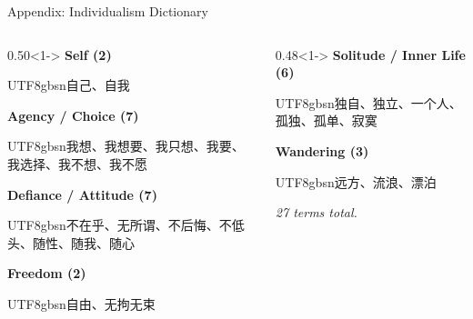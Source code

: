 \documentclass[aspectratio=169]{beamer}
\begin{document}
\begin{frame}[label=appendix-indiv-dict]{Appendix: Individualism Dictionary}
\footnotesize
\begin{columns}[T]
\begin{column}{0.50\textwidth}<1->
  \textbf{Self (2)} \\
  \begin{CJK}{UTF8}{gbsn}自己、自我\end{CJK}

  \smallskip
  \textbf{Agency / Choice (7)} \\
  \begin{CJK}{UTF8}{gbsn}我想、我想要、我只想、我要、我选择、我不想、我不愿\end{CJK}

  \smallskip
  \textbf{Defiance / Attitude (7)} \\
  \begin{CJK}{UTF8}{gbsn}不在乎、无所谓、不后悔、不低头、随性、随我、随心\end{CJK}

  \smallskip
  \textbf{Freedom (2)} \\
  \begin{CJK}{UTF8}{gbsn}自由、无拘无束\end{CJK}
\end{column}
\begin{column}{0.48\textwidth}<1->
  \textbf{Solitude / Inner Life (6)} \\
  \begin{CJK}{UTF8}{gbsn}独自、独立、一个人、孤独、孤单、寂寞\end{CJK}

  \smallskip
  \textbf{Wandering (3)} \\
  \begin{CJK}{UTF8}{gbsn}远方、流浪、漂泊\end{CJK}

  \smallskip
  \textit{27 terms total.}
\end{column}
\end{columns}

\vspace{0.4em}
\hyperlink{slide-dictmeasures}{}
\hfill
\hyperlink{appendix-indiv-dict-en}{}
\hspace{0.3em}
\hyperlink{appendix-collec-dict}{}
\end{frame}
\end{document}
